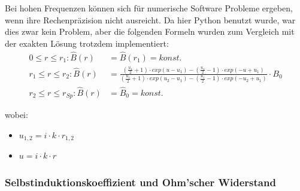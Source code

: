 Bei hohen Frequenzen k\"onnen sich f\"ur numerische Software Probleme ergeben,
wenn ihre Rechenpr\"azision nicht ausreicht. Da hier Python benutzt wurde, war
dies zwar  kein Problem, aber die  folgenden Formeln wurden zum  Vergleich mit
der exakten L\"osung trotzdem implementiert:
\vspace{-0.5em}
\begin{align}
    \label{eq:hohlzylinder:BExact}
    0 \leq r \leq r_1:      \hat{B} (r) & = \hat{B} (r_1) = konst. \\
    r_1 \leq r \leq r_2:    \hat{B} (r) & = \frac{(\frac{u_1}{2} + 1 ) \cdot exp(u - u_1) - (\frac{u_1}{2} - 1 ) \cdot exp(-u+u_1)}{(\frac{u_1}{2} + 1 ) \cdot exp(u_2 - u_1) - (\frac{u_1}{2} - 1 ) \cdot exp(-u_2+u_1)} \cdot B_0  \\
    r_2 \leq r \leq r_{Sp}: \hat{B} (r) & = \hat{B}_0 = konst.
\end{align}

wobei:

\begin{itemize}
    \item[]
        $u_{1,2} = i \cdot k \cdot r_{1,2}$
    \item[]
        $u = i \cdot k \cdot r$
\end{itemize}


\subsubsection{Selbstinduktionskoeffizient und Ohm'scher Widerstand}
\label{sec:arbgru:subsec:hohlzylinder:LRexakt}

